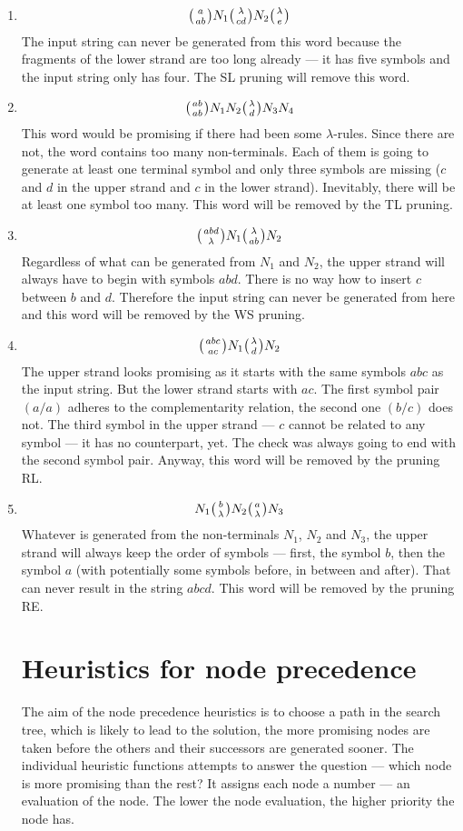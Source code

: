 \begin{enumerate}
\item{
$$\wkpair{a}{ab} N_1 \wkpair{\lambda}{cd} N_2 \wkpair{\lambda}{e}$$
The input string can never be generated from this word because the fragments of the lower strand are too long already --- it has five symbols and the input string only has four. The SL pruning will remove this word.
}
\item{
$$\wkpair{ab}{ab} N_1 N_2 \wkpair{\lambda}{d} N_3 N_4$$
This word would be promising if there had been some $\lambda$-rules. Since there are not, the word contains too many non-terminals. Each of them is going to generate at least one terminal symbol and only three symbols are missing ($c$ and $d$ in the upper strand and $c$ in the lower strand). Inevitably, there will be at least one symbol too many. This word will be removed by the TL pruning.
}
\item{
$$\wkpair{abd}{\lambda} N_1 \wkpair{\lambda}{ab} N_2$$
Regardless of what can be generated from $N_1$ and $N_2$, the upper strand will always have to begin with symbols $abd$. There is no way how to insert $c$ between $b$ and $d$. Therefore the input string can never be generated from here and this word will be removed by the WS pruning.
}
\item{
$$\wkpair{abc}{ac} N_1 \wkpair{\lambda}{d} N_2$$
The upper strand looks promising as it starts with the same symbols $abc$ as the input string. But the lower strand starts with $ac$. The first symbol pair $(a/a)$ adheres to the complementarity relation, the second one $(b/c)$ does not. The third symbol in the upper strand --- $c$ cannot be related to any symbol --- it has no counterpart, yet. The check was always going to end with the second symbol pair. Anyway, this word will be removed by the pruning RL.
}
\item{
$$N_1 \wkpair{b}{\lambda} N_2 \wkpair{a}{\lambda} N_3$$
Whatever is generated from the non-terminals $N_1$, $N_2$ and $N_3$, the upper strand will always keep the order of symbols --- first, the symbol $b$, then the symbol $a$ (with potentially some symbols before, in between and after). That can never result in the string $abcd$. This word will be removed by the pruning RE.
}

\section{Heuristics for node precedence} \label{heur_node_pref}

The aim of the node precedence heuristics is to choose a path in the search tree, which is likely to lead to the solution, the more promising nodes are taken before the others and their successors are generated sooner. The individual heuristic functions attempts to answer the question --- which node is more promising than the rest? It assigns each node a number --- an evaluation of the node. The lower the node evaluation, the higher priority the node has.


\end{enumerate}

